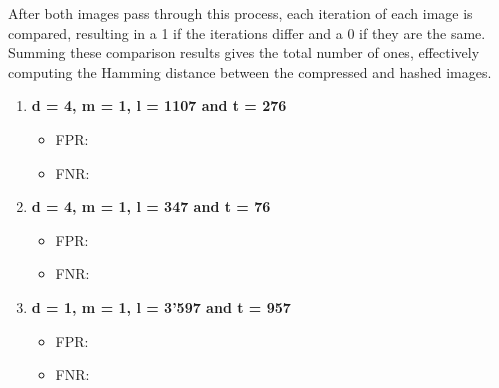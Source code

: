 After both images pass through this process, each iteration of each image is compared, resulting in a 1 if the iterations differ and a 0 if they are the same. Summing these comparison results gives the total number of ones, effectively computing the Hamming distance between the compressed and hashed images.

\begin{enumerate}
    \item \textbf{d = 4, m = 1, l = 1107 and t = 276}
        \begin{itemize}
            \item FPR: 
            \item FNR: 
        \end{itemize}
    \item \textbf{d = 4, m = 1, l = 347 and t = 76}
        \begin{itemize}
            \item FPR: 
            \item FNR: 
        \end{itemize}
    \item \textbf{d = 1, m = 1, l = 3'597 and t = 957}
        \begin{itemize}
            \item FPR: 
            \item FNR: 
        \end{itemize}
\end{enumerate}